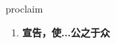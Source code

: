 
\begin{frame}
{\huge proclaim}
\begin{center}
\begin{enumerate}\Large
  \item \textbf{宣告，使...公之于众}
\end{enumerate}
\end{center}
\end{frame}
